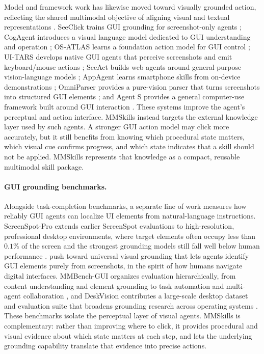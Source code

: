 Model and framework work has likewise moved toward visually grounded action, reflecting the shared multimodal objective of aligning visual and textual representations \citep{liu2024alignrecaligningtrainingmultimodalrecommendations,zhang2024dreamdualrepresentationlearningmodel}. SeeClick trains GUI grounding for screenshot-only agents \citep{cheng2024seeclick}; CogAgent introduces a visual language model dedicated to GUI understanding and operation \citep{hong2024cogagentvisuallanguagemodel}; OS-ATLAS learns a foundation action model for GUI control \citep{wu2024osatlas}; UI-TARS develops native GUI agents that perceive screenshots and emit keyboard/mouse actions \citep{qin2025uitars}; SeeAct builds web agents around general-purpose vision-language models \citep{zheng2024gpt4visiongeneralistwebagent}; AppAgent learns smartphone skills from on-device demonstrations \citep{zhang2023appagentmultimodalagentssmartphone}; OmniParser provides a pure-vision parser that turns screenshots into structured GUI elements \citep{lu2024omniparserpurevisionbased}; and Agent S provides a general computer-use framework built around GUI interaction \citep{agashe2024agents}. These systems improve the agent's perceptual and action interface. MMSkills instead targets the external knowledge layer used by such agents. A stronger GUI action model may click more accurately, but it still benefits from knowing which procedural state matters, which visual cue confirms progress, and which state indicates that a skill should not be applied. MMSkills represents that knowledge as a compact, reusable multimodal skill package.

\paragraph{GUI grounding benchmarks.}
Alongside task-completion benchmarks, a separate line of work measures how reliably GUI agents can localize UI elements from natural-language instructions. ScreenSpot-Pro extends earlier ScreenSpot evaluations to high-resolution, professional desktop environments, where target elements often occupy less than $0.1\%$ of the screen and the strongest grounding models still fall well below human performance \citep{li2025screenspotproguigroundingprofessional}. \citet{gou2025navigatingdigitalworldhumans} push toward universal visual grounding that lets agents identify GUI elements purely from screenshots, in the spirit of how humans navigate digital interfaces. MMBench-GUI organizes evaluation hierarchically, from content understanding and element grounding to task automation and multi-agent collaboration \citep{wang2025mmbenchguihierarchicalmultiplatformevaluation}, and DeskVision contributes a large-scale desktop dataset and evaluation suite that broadens grounding research across operating systems \citep{xu2025deskvisionlargescaledesktop}. These benchmarks isolate the perceptual layer of visual agents. MMSkills is complementary: rather than improving where to click, it provides procedural and visual evidence about which state matters at each step, and lets the underlying grounding capability translate that evidence into precise actions.


